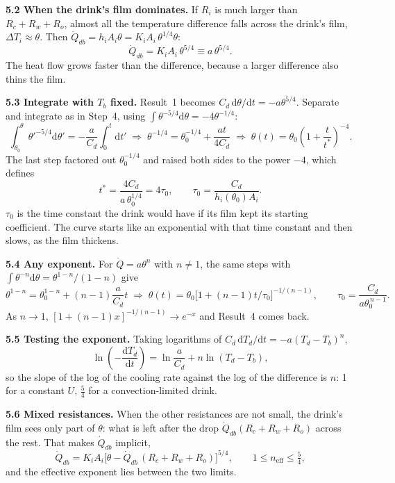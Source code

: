 \documentclass[11pt,a4paper]{article}
\newcommand{\dd}{\mathrm{d}}
\newcommand{\Qdb}{\dot Q_{db}}
\newcommand{\sub}[1]{\par\smallskip\noindent\textbf{#1}\enspace}
\begin{document}
\sub{5.2 When the drink's film dominates.} If $R_i$ is much larger than $R_c+R_w+R_o$, almost all the
temperature difference falls across the drink's film, $\Delta T_i \approx \theta$. Then
$\Qdb = h_iA_i\theta = K_iA_i\,\theta^{1/4}\theta$:
\[ \Qdb = K_iA_i\,\theta^{5/4} \equiv a\,\theta^{5/4}. \]
The heat flow grows faster than the difference, because a larger difference also thins the film.

\sub{5.3 Integrate with $T_b$ fixed.} Result~1 becomes $C_d\,\dd\theta/\dd t = -a\theta^{5/4}$. Separate and
integrate as in Step~4, using $\int\theta^{-5/4}\dd\theta = -4\theta^{-1/4}$:
\[
\int_{\theta_0}^{\theta}\theta'^{-5/4}\dd\theta' = -\frac{a}{C_d}\int_0^t\dd t'
\;\Rightarrow\;
\theta^{-1/4} = \theta_0^{-1/4} + \frac{at}{4C_d}
\;\Rightarrow\;
\theta(t) = \theta_0\left(1+\frac{t}{t^*}\right)^{-4}.
\]
The last step factored out $\theta_0^{-1/4}$ and raised both sides to the power $-4$, which defines
\[
t^* = \frac{4C_d}{a\,\theta_0^{1/4}} = 4\tau_0, \qquad \tau_0 = \frac{C_d}{h_i(\theta_0)A_i}.
\]
$\tau_0$ is the time constant the drink would have if its film kept its starting coefficient. The curve
starts like an exponential with that time constant and then slows, as the film thickens.

\sub{5.4 Any exponent.} For $\dot Q = a\theta^n$ with $n\neq1$, the same steps with
$\int\theta^{-n}\dd\theta = \theta^{1-n}/(1-n)$ give
\[
\theta^{1-n} = \theta_0^{1-n} + (n-1)\frac{a}{C_d}t
\;\Rightarrow\;
\theta(t) = \theta_0\big[1+(n-1)t/\tau_0\big]^{-1/(n-1)}, \qquad \tau_0 = \frac{C_d}{a\theta_0^{\,n-1}} .
\]
As $n\to1$, $[1 + (n-1)x]^{-1/(n-1)} \to e^{-x}$ and Result~4 comes back.

\sub{5.5 Testing the exponent.} Taking logarithms of $C_d\,\dd T_d/\dd t = -a(T_d-T_b)^n$,
\[ \ln\!\left(-\frac{\dd T_d}{\dd t}\right) = \ln\frac{a}{C_d} + n\ln(T_d - T_b), \]
so the slope of the log of the cooling rate against the log of the difference is $n$: 1 for a constant
$U$, $\tfrac54$ for a convection-limited drink.

\sub{5.6 Mixed resistances.} When the other resistances are not small, the drink's film sees only part of
$\theta$: what is left after the drop $\Qdb(R_c+R_w+R_o)$ across the rest. That makes $\Qdb$ implicit,
\[ \Qdb = K_iA_i\big[\theta - \Qdb\,(R_c+R_w+R_o)\big]^{5/4}, \qquad 1 \le n_{\mathrm{eff}} \le \tfrac54 , \]
and the effective exponent lies between the two limits.
\end{document}
